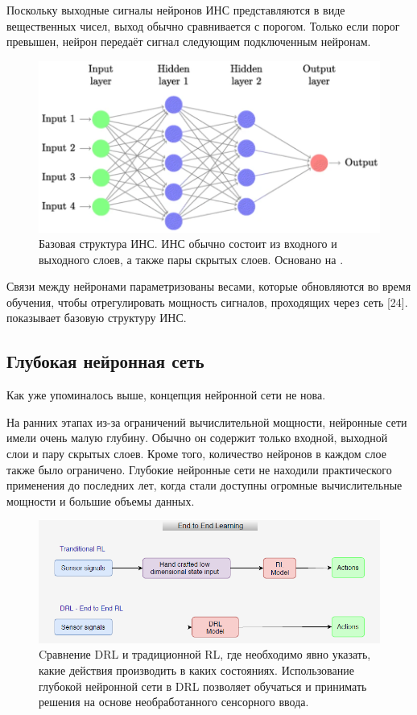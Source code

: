 Поскольку выходные сигналы нейронов ИНС представляются в виде вещественных чисел, выход обычно сравнивается с порогом. Только если порог превышен, нейрон передаёт сигнал следующим подключенным нейронам. 

\begin{figure}[ht!] 
	\center
	\includegraphics [scale=0.60] {my_folder/images/ch1/ANN.png}
	\caption{Базовая структура ИНС. ИНС обычно состоит из входного и выходного слоев, а также пары скрытых слоев. Основано на \cite{Khajanchi2003ArtificialNN} \cite{mitchell1997machine}.} 
	\label{fig:ch1-ANN}
\end{figure}

Связи между нейронами параметризованы весами, которые обновляются во время обучения, чтобы отрегулировать мощность сигналов, проходящих через сеть [24].  показывает базовую структуру ИНС.


\subsection{Глубокая нейронная сеть}

Как уже упоминалось выше, концепция нейронной сети не нова.

На ранних этапах из-за ограничений вычислительной мощности, нейронные сети имели очень малую глубину. Обычно он содержит только входной, выходной слои и пару скрытых слоев. Кроме того, количество нейронов в каждом слое также было ограничено. Глубокие нейронные сети не находили практического применения до последних лет, когда стали доступны огромные вычислительные мощности и большие объемы данных.

\begin{figure}[ht!] 
	\center
	\includegraphics [scale=0.80] {my_folder/images/ch1/DRL-flow.png}
	\caption{Cравнение DRL и традиционной RL, где необходимо явно указать, какие действия производить в каких состояниях. Использование глубокой нейронной сети в DRL позволяет обучаться и принимать решения на основе необработанного сенсорного ввода.} 
	\label{fig:DRL-flow}
\end{figure} %

